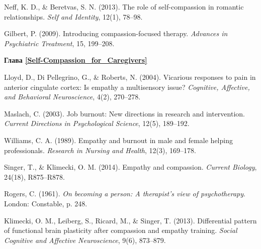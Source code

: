 \begin{thebibliography}{999}
	
	 Neff, K. D., \& Beretvas, S. N. (2013). The role of self-compassion in romantic relationships. \textit{Self and Identity}, 12(1), 78–98.
	
	 Gilbert, P. (2009). Introducing compassion-focused therapy. \textit{Advances in Psychiatric Treatment}, 15, 199–208.
	
	
	\vspace{3ex}
	\textbf{Глава \ref{Self-Compassion_for_Caregivers}}
	
	 Lloyd, D., Di Pellegrino, G., \& Roberts, N. (2004). Vicarious responses to pain in anterior cingulate cortex: Is empathy a multisensory issue? \textit{Cognitive, Affective, and Behavioral Neuroscience}, 4(2), 270–278.
	
	 Maslach, C. (2003). Job burnout: New directions in research and intervention. \textit{Current Directions in Psychological Science}, 12(5), 189–192.
	
	 Williams, C. A. (1989). Empathy and burnout in male and female helping professionals. \textit{Research in Nursing and Health}, 12(3), 169–178.
	
	 Singer, T., \& Klimecki, O. M. (2014). Empathy and compassion. \textit{Current Biology}, 24(18), R875–R878. 

	 Rogers, C. (1961). \textit{On becoming a person: A therapist’s view of psychotherapy}. London: Constable, p. 248.
	
	 Klimecki, O. M., Leiberg, S., Ricard, M., \& Singer, T. (2013). Differential pattern of functional brain plasticity after compassion and empathy training. \textit{Social Cognitive and Affective Neuroscience}, 9(6), 873–879.
\end{thebibliography}
